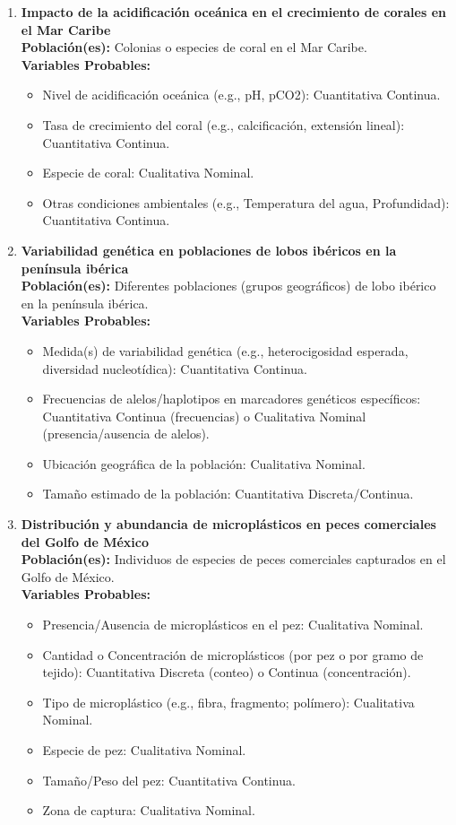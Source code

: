 \documentclass[12pt, letterpaper]{article}
\begin{document}
\begin{enumerate}
\item \textbf{Impacto de la acidificación oceánica en el crecimiento de corales en el Mar Caribe} \\
\textbf{Población(es):} Colonias o especies de coral en el Mar Caribe. \\
\textbf{Variables Probables:}
\begin{itemize}
  \item Nivel de acidificación oceánica (e.g., pH, pCO2): Cuantitativa Continua.
  \item Tasa de crecimiento del coral (e.g., calcificación, extensión lineal): Cuantitativa Continua.
  \item Especie de coral: Cualitativa Nominal.
  \item Otras condiciones ambientales (e.g., Temperatura del agua, Profundidad): Cuantitativa Continua.
\end{itemize}

\item \textbf{Variabilidad genética en poblaciones de lobos ibéricos en la península ibérica} \\
\textbf{Población(es):} Diferentes poblaciones (grupos geográficos) de lobo ibérico en la península ibérica. \\
\textbf{Variables Probables:}
\begin{itemize}
  \item Medida(s) de variabilidad genética (e.g., heterocigosidad esperada, diversidad nucleotídica): Cuantitativa Continua.
  \item Frecuencias de alelos/haplotipos en marcadores genéticos específicos: Cuantitativa Continua (frecuencias) o Cualitativa Nominal (presencia/ausencia de alelos).
  \item Ubicación geográfica de la población: Cualitativa Nominal.
  \item Tamaño estimado de la población: Cuantitativa Discreta/Continua.
\end{itemize}

\item \textbf{Distribución y abundancia de microplásticos en peces comerciales del Golfo de México} \\
\textbf{Población(es):} Individuos de especies de peces comerciales capturados en el Golfo de México. \\
\textbf{Variables Probables:}
\begin{itemize}
  \item Presencia/Ausencia de microplásticos en el pez: Cualitativa Nominal.
  \item Cantidad o Concentración de microplásticos (por pez o por gramo de tejido): Cuantitativa Discreta (conteo) o Continua (concentración).
  \item Tipo de microplástico (e.g., fibra, fragmento; polímero): Cualitativa Nominal.
  \item Especie de pez: Cualitativa Nominal.
  \item Tamaño/Peso del pez: Cuantitativa Continua.
  \item Zona de captura: Cualitativa Nominal.
\end{itemize}


\end{enumerate}
\end{document}
